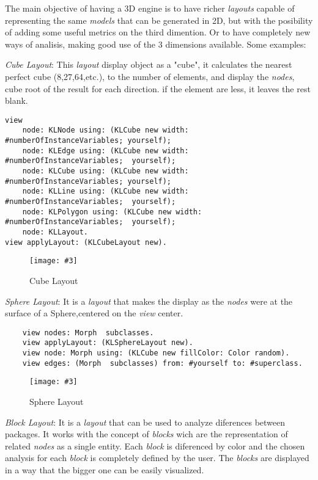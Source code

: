\documentclass{sig-alternate}
\newcommand{\ab}[1]{\nb{Alexandre}{blue}{#1}}
\newcommand{\fig}[4]{
	\begin{figure}[#1]
		\centering
		\texttt{[image: \#3]}
		\caption{\label{fig:#3}#4}
	\end{figure}}
\begin{document}
The main objective of having a 3D engine is to have richer 
\emph{layouts} capable of representing the same \emph{models} 
that can be generated in 2D, but with the posibility of adding 
some useful metrics on the third dimention. Or to have 
completely new ways of analisis, making good use of the 3 
dimensions available.
Some examples:

\emph{Cube Layout}: This \emph{layout} display object as a "cube",
it calculates the nearest perfect cube (8,27,64,etc.), to the
number of elements, and display the \emph{nodes}, cube root 
of the result for each direction. if the element are less,
it leaves the rest blank.

\begin{lstlisting}
view 
	node: KLNode using: (KLCube new width:  #numberOfInstanceVariables; yourself);
	node: KLEdge using: (KLCube new width:  #numberOfInstanceVariables;  yourself);
	node: KLCube using: (KLCube new width:  #numberOfInstanceVariables; yourself);
	node: KLLine using: (KLCube new width:  #numberOfInstanceVariables;  yourself);
	node: KLPolygon using: (KLCube new width:  #numberOfInstanceVariables;  yourself);
	node: KLLayout.
view applyLayout: (KLCubeLayout new). 
\end{lstlisting}
\fig{}{0.6}{figure7.png}{Cube Layout\ab{Fix the picture}}

\emph{Sphere Layout}: It is a \emph{layout} that makes the display
as the \emph{nodes} were at the surface of a Sphere,centered on the
\emph{view} center. 

\begin{lstlisting}
	view nodes: Morph  subclasses.
	view applyLayout: (KLSphereLayout new).
	view node: Morph using: (KLCube new fillColor: Color random).
	view edges: (Morph  subclasses) from: #yourself to: #superclass.
\end{lstlisting}
\fig{}{0.4}{figure8.png}{Sphere Layout}

\emph{Block Layout}: It is a \emph{layout} that can be used to 
analyze diferences between packages. It works with the concept
of \emph{blocks} wich are the representation of related \emph{nodes}
as a single entity. Each \emph{block} is diferenced by color and the
chosen analysis for each \emph{block} is completely defined by the
user. The \emph{blocks} are displayed in a way that the bigger one
can be easily visualized.
\end{document}
